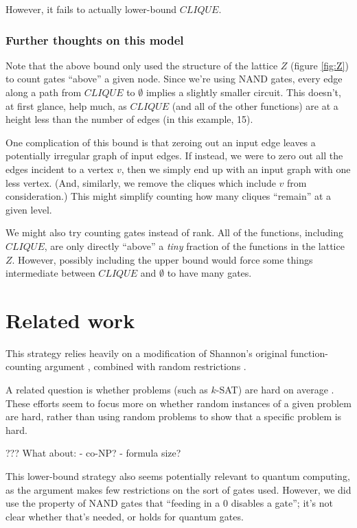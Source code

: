 \documentclass[12pt]{article}
\theoremstyle{definition}
\begin{document}
However, it fails to actually lower-bound $CLIQUE$.

\subsubsection{Further thoughts on this model}

Note that the above bound only used the structure of the lattice $Z$ 
(figure \ref{fig:Z}) to count gates ``above'' a given node.
Since we're using NAND gates, every edge along a path from $CLIQUE$ to $\emptyset$
implies a slightly smaller circuit. This doesn't, at first glance, help much, as
$CLIQUE$ (and all of the other functions) are at a height less than the number of edges
(in this example, 15).

One complication of this bound is that zeroing out an input edge leaves a potentially
irregular graph of input edges. If instead, we were to zero out all the edges incident to a
vertex $v$, then we simply end up with an input graph with one less vertex.
(And, similarly, we remove the cliques which include $v$ from consideration.)
This might simplify counting how many cliques ``remain'' at a given level.

We might also try counting gates instead of rank.
All of the functions, including $CLIQUE$, are only directly
``above'' a {\em tiny} fraction of the functions
in the lattice $Z$. However, possibly including the upper bound would force some
things intermediate between $CLIQUE$ and $\emptyset$ to have many gates.

\section{Related work}

This strategy relies heavily on a modification of Shannon's original
function-counting argument \cite{shannon_synthesis_1949},
combined with random restrictions
\cite{subbotovskaya1963comparison} \cite{hastad1987lower}.

A related question is whether problems
(such as $k$-SAT) are
hard on average \cite{bogdanov2006average}.
These efforts seem to focus more on whether
random
instances of a given problem are hard, rather
than using random problems to show that
a specific problem is hard.

??? What about:
- co-NP?
- formula size?


This lower-bound strategy also seems potentially
relevant to quantum computing,
as the argument makes few restrictions on the sort of gates used.
However, we did use the property of NAND gates that ``feeding in
a 0 disables a gate''; it's not clear whether that's needed,
or holds for quantum gates.
\end{document}
